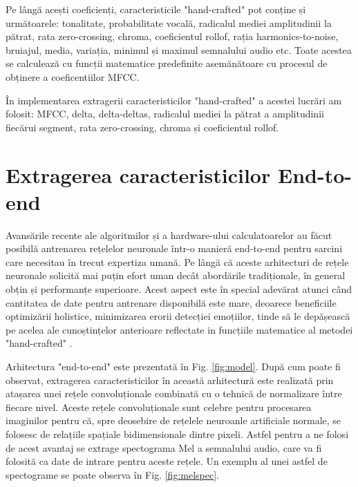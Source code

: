 \documentclass[a4paper,12pt]{book}
\begin{document}
				Pe lângă acești coeficienți, caracteristicile "hand-crafted" pot conține și următoarele: tonalitate, probabilitate vocală, radicalul mediei amplitudinii la pătrat, rata zero-crossing, chroma, coeficientul rollof, rația harmonics-to-noise, bruiajul, media, variația, minimul și maximul semnalului audio etc. Toate acestea se calculează cu funcții matematice predefinite asemănătoare cu procesul de obținere a coeficentiilor MFCC.			
				
				În implementarea extragerii caracteristicilor "hand-crafted" a acestei lucrări am folosit: MFCC, delta, delta-deltas, radicalul mediei la pătrat a amplitudinii fiecărui segment, rata zero-crossing, chroma și coeficientul rollof.
				
			\section{Extragerea caracteristicilor End-to-end}	\label{end-to-end}
			
			Avansările recente ale algoritmilor și a hardware-ului calculatoarelor au făcut posibilă antrenarea rețelelor neuronale într-o manieră end-to-end pentru sarcini care necesitau în trecut expertiza umană. Pe lângă că aceste arhitecturi de rețele neuronale solicită mai puțin efort uman decât abordările tradiționale, în general obțin și performanțe superioare. Acest aspect este în special adevărat atunci când cantitatea de date pentru antrenare disponibilă este mare, deoarece beneficiile optimizării holistice, minimizarea erorii detecției emoțiilor, tinde să le depășească pe acelea ale cunoștințelor anterioare reflectate in funcțiile matematice al metodei "hand-crafted" \cite{graves}. \par
			
			Arhitectura "end-to-end" este prezentată în Fig. \ref{fig:model}. După cum poate fi observat, extragerea caracteristicilor în această  arhitectură este realizată prin atașarea unei rețele convoluționale combinată cu o tehnică de normalizare între fiecare nivel. Aceste rețele convoluționale sunt celebre pentru procesarea imaginilor pentru că, spre deosebire de rețelele neuroanle artificiale normale, se folosesc de relațiile spațiale bidimensionale dintre pixeli. Astfel pentru a ne folosi de acest avantaj se extrage spectograma Mel a semnalului audio, care va fi folosită ca date de intrare pentru aceste rețele. Un exemplu al unei astfel de spectograme se poate observa în Fig. \ref{fig:melspec}. \par
						
\end{document}
